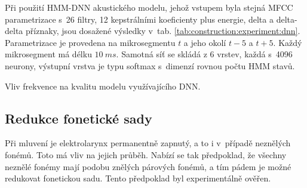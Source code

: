 Při použití HMM-DNN akustického modelu, jehož vstupem byla stejná MFCC parametrizace s~26 filtry, 12 kepstrálními koeficienty plus energie, delta a delta-delta příznaky, jsou dosažené výsledky v~tab. \ref{tab:construction:experiment:dnn}.
Parametrizace je provedena na mikrosegmentu $t$ a jeho okolí $t-5$ a $t+5$.
Každý mikrosegment má délku $10\ ms$.
Samotná síť se skládá z 6 vrstev, každá s~4096 neurony, výstupní vrstva je typu softmax s~dimenzí rovnou počtu HMM stavů.

\begin{table}[htpb]
  \centering
  \def\arraystretch{1.5}
  \caption{Vliv frekvence na kvalitu modelu využívajícího DNN.}
  \label{tab:construction:experiment:dnn}
\end{table}

\subsection{Redukce fonetické sady}
\label{chap:construction:results:reduction}

Při mluvení je elektrolarynx permanentně zapnutý, a to i v~případě neznělých fonémů.
Toto má vliv na jejich průběh.
Nabízí se tak předpoklad, že všechny neznělé fonémy mají podobu znělých párových fonémů, a tím pádem je možné redukovat fonetickou sadu. Tento předpoklad byl experimentálně ověřen.

